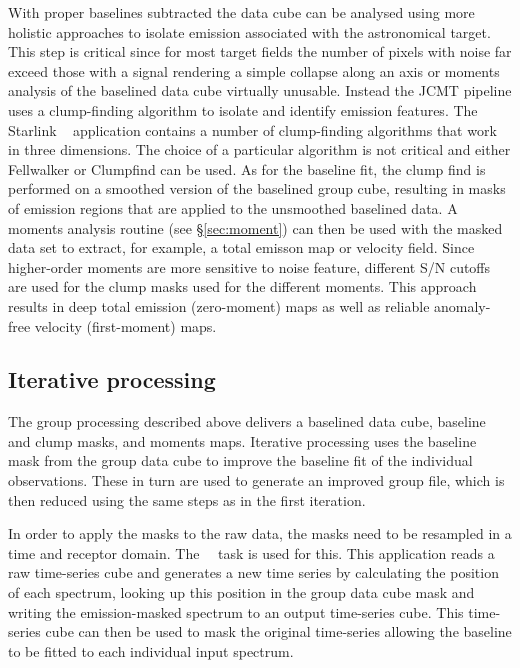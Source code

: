 \documentclass[final,authoryear,5p,times,twocolumn]{elsarticle}
\begin{document}
With proper baselines subtracted the data cube can be analysed using more
holistic approaches to isolate emission associated with the astronomical
target. This step is critical since for most target fields the number of pixels with
noise far exceed those with a signal rendering a simple collapse along an axis
or moments analysis of the baselined data cube virtually unusable. Instead
the JCMT pipeline uses a clump-finding algorithm to isolate and identify
emission features.
The Starlink \cupid\ \citep[][]{2007ASPC..376..425B} application contains
a number of clump-finding algorithms that work in three dimensions.
The choice of a particular algorithm is not critical and either Fellwalker or
Clumpfind \citep[][]{1994ApJ...428..693W} can be used.
As for the baseline fit, the clump find is performed on a smoothed version
of the baselined group cube, resulting in masks of emission regions that
are applied to the unsmoothed baselined data. A moments analysis routine
(see \S \ref{sec:moment}) can then be used with the masked data set to
extract, for example, a total emisson map or velocity field. Since higher-order moments are
more sensitive to noise feature, different S/N cutoffs are used for the
clump masks used for the different moments. This approach results in deep
total emission (zero-moment) maps as well as reliable anomaly-free
velocity (first-moment) maps.


\subsection{Iterative processing}

The group processing described above delivers a baselined data cube,
baseline and clump masks, and moments maps. Iterative processing uses
the baseline mask from the group data cube to improve the baseline fit
of the individual observations. These in turn are used to generate an improved
group file, which is then reduced using the same steps as in the first iteration.

In order to apply the masks to the raw data, the masks need to be resampled
in a time and receptor domain. The \smurf\ \unmakecube\ task
\citep[][]{SUN258} is used for this. This application
reads a raw time-series cube and generates a new time series by
calculating the position of each spectrum, looking up this position in
the group data cube mask and writing the emission-masked spectrum to
an output time-series cube. This time-series cube can then be used to
mask the original time-series allowing the baseline to be fitted to
each individual input spectrum.
\end{document}
